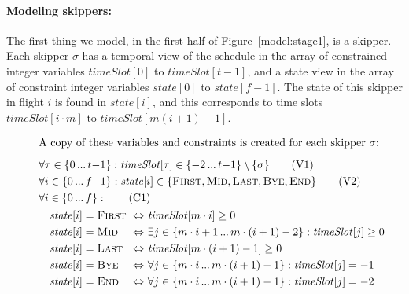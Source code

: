 \documentclass{llncs}
\newcommand{\timeSlot}{\mathit{timeSlot}}
\newcommand{\state}{\mathit{state}}
\newcommand{\FIRST}{\textnormal{\textsc{First}}}
\newcommand{\MID}{\textnormal{\textsc{Mid}}}
\newcommand{\LAST}{\textnormal{\textsc{Last}}}
\newcommand{\END}{\textnormal{\textsc{End}}}
\newcommand{\BYE}{\textnormal{\textsc{Bye}}}
\newcommand\nldots{\,\hbox to 0.8em{.\hss.\hss.}\,}
\begin{document}
\paragraph{Modeling skippers:} The first thing we model, in the first half of
Figure~\ref{model:stage1}, is a skipper. Each skipper $\sigma$ has a temporal view of the schedule
in the array of constrained integer variables $\timeSlot[0]$ to $\timeSlot[{t-1}]$, and a state view
in the array of constraint integer variables $\state[0]$ to $\state[{f-1}]$. The state of this
skipper in flight $i$ is found in $\state[i]$, and this corresponds to time slots $\timeSlot[{i \cdot
m}]$ to $\timeSlot[{m(i+1)-1}]$.

\begin{figure}[p]
\setlength{\mathindent}{1em}
\setlength{\abovedisplayskip}{0pt}
\setlength{\belowdisplayskip}{0pt}
\setlength{\abovecaptionskip}{0pt}
\begin{framed}
\begin{align}
    \intertext{A copy of these variables and constraints is created for each skipper $\sigma$:\smallskip}
    &\forall \tau \in \{0 \nldots t{-}1\}: \timeSlot[{\tau}] \in \{{-}2 \nldots t{-}1\} \setminus \{\sigma\} \label{var:timeSlot} \tag{V1} \\
    &\forall i \in \{0 \nldots f{-}1\}: \state[{i}] \in \{\FIRST,\MID,\LAST,\BYE,\END\} \label{var:state} \tag{V2} \\
    &\forall i \in \{0 \nldots f\}: \label{C1} \tag{C1} \\
    &\begin{alignedat}{3}
    &\hspace*{1em} \state[{i}] = \FIRST &\ &\Leftrightarrow&&\ \timeSlot[{m \cdot i}] \geq 0 \\
    &\hspace*{1em} \state[{i}] = \MID   &\ &\Leftrightarrow&&\ \exists j \in \{m \cdot i + 1 \nldots m \cdot (i + 1) - 2\} : \timeSlot[{j}] \geq 0 \\
    &\hspace*{1em} \state[{i}] = \LAST  &\ &\Leftrightarrow&&\ \timeSlot[m \cdot (i + 1) - 1] \geq 0 \\
    &\hspace*{1em} \state[{i}] = \BYE   &\ &\Leftrightarrow&&\ \forall j \in \{m \cdot i \nldots m \cdot (i + 1) - 1\} : \timeSlot[j] = -1 \\
    &\hspace*{1em} \state[{i}] = \END   &\ &\Leftrightarrow&&\ \forall j \in \{m \cdot i \nldots m \cdot (i + 1) - 1\} : \timeSlot[j] = -2

\end{alignedat}
\end{align}
\end{framed}
\end{figure}
\end{document}
